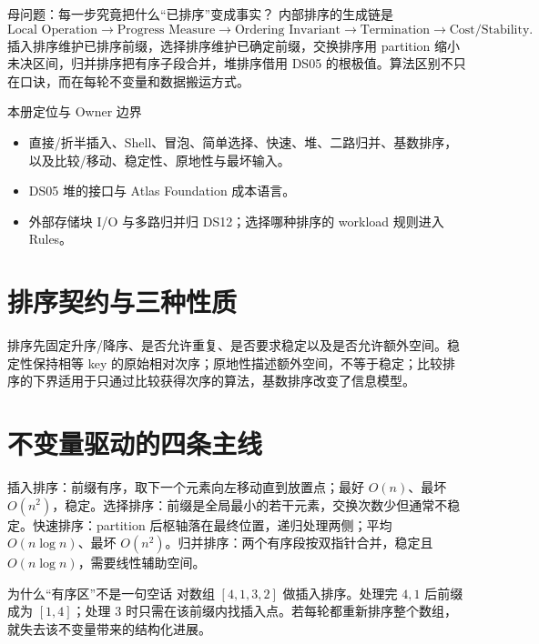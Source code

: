 \documentclass[UTF8,fontset=none,11pt,a4paper]{ctexart}
\begin{document}

\begin{corebox}{母问题：每一步究竟把什么“已排序”变成事实？}
内部排序的生成链是
\[
\text{Local Operation}\to\text{Progress Measure}\to\text{Ordering Invariant}\to\text{Termination}\to\text{Cost/Stability}.
\]
插入排序维护已排序前缀，选择排序维护已确定前缀，交换排序用 partition 缩小未决区间，归并排序把有序子段合并，堆排序借用 DS05 的根极值。算法区别不只在口诀，而在每轮不变量和数据搬运方式。
\end{corebox}
\begin{methodbox}{本册定位与 Owner 边界}
\begin{itemize}
\item {}直接/折半插入、Shell、冒泡、简单选择、快速、堆、二路归并、基数排序，以及比较/移动、稳定性、原地性与最坏输入。
\item {}DS05 堆的接口与 Atlas Foundation 成本语言。
\item {}外部存储块 I/O 与多路归并归 DS12；选择哪种排序的 workload 规则进入 Rules。
\end{itemize}
\end{methodbox}
\tableofcontents\newpage

\section{排序契约与三种性质}
排序先固定升序/降序、是否允许重复、是否要求稳定以及是否允许额外空间。稳定性保持相等 key 的原始相对次序；原地性描述额外空间，不等于稳定；比较排序的下界适用于只通过比较获得次序的算法，基数排序改变了信息模型。

\section{不变量驱动的四条主线}
插入排序：前缀有序，取下一个元素向左移动直到放置点；最好 $O(n)$、最坏 $O(n^2)$，稳定。选择排序：前缀是全局最小的若干元素，交换次数少但通常不稳定。快速排序：partition 后枢轴落在最终位置，递归处理两侧；平均 $O(n\log n)$、最坏 $O(n^2)$。归并排序：两个有序段按双指针合并，稳定且 $O(n\log n)$，需要线性辅助空间。
\begin{examplebox}{为什么“有序区”不是一句空话}
对数组 $[4,1,3,2]$ 做插入排序。处理完 $4,1$ 后前缀成为 $[1,4]$；处理 $3$ 时只需在该前缀内找插入点。若每轮都重新排序整个数组，就失去该不变量带来的结构化进展。
\end{examplebox}
\end{document}
